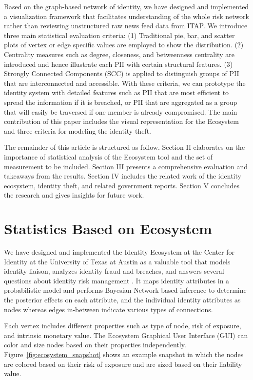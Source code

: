 \documentclass[conference]{IEEEtran}
\begin{document}
Based on the graph-based network of identity, we have designed and implemented a visualization framework that facilitates understanding of the whole risk network rather than reviewing unstructured raw news feed data from ITAP. We introduce three main statistical evaluation criteria: (1) Traditional pie, bar, and scatter plots of vertex or edge specific values are employed to show the distribution. (2) Centrality measures such as degree, closeness, and betweenness centrality are introduced and hence illustrate each PII with certain structural features. (3) Strongly Connected Components (SCC) is applied to distinguish groups of PII that are interconnected and accessible.  With these criteria, we can prototype the identity system with detailed features such as PII that are most efficient to spread the information if it is breached, or PII that are aggregated as a group that will easily be traversed if one member is already compromised. The main contribution of this paper includes the visual representation for the Ecosystem and three criteria for modeling the identity theft.  

The remainder of this article is structured as follow. Section II elaborates on the importance of statistical analysis of the Ecosystem tool and the set of measurement to be included. Section III presents a comprehensive evaluation and takeaways from the results. Section IV includes the related work of the identity ecosystem, identity theft, and related government reports. Section V concludes the research and gives insights for future work.

\section{Statistics Based on Ecosystem}

 We have designed and implemented the Identity Ecosystem at the Center for Identity at the University of Texas at Austin as a valuable tool that models identity liaison, analyzes identity fraud and breaches, and answers several questions about identity risk management \cite{EcosystemModeling}. It maps identity attributes in a probabilistic model and performs Bayesian Network-based inference to determine the posterior effects on each attribute, and the individual identity attributes as nodes whereas edges in-between indicate various types of connections.
 
Each vertex includes different properties such as type of node, risk of exposure, and intrinsic monetary value. The Ecosystem Graphical User Interface (GUI) can color and size nodes based on their properties independently. Figure~\ref{fig:ecosystem_snapshot} shows an example snapshot in which the nodes are colored based on their risk of exposure and are sized based on their liability value.
\end{document}
